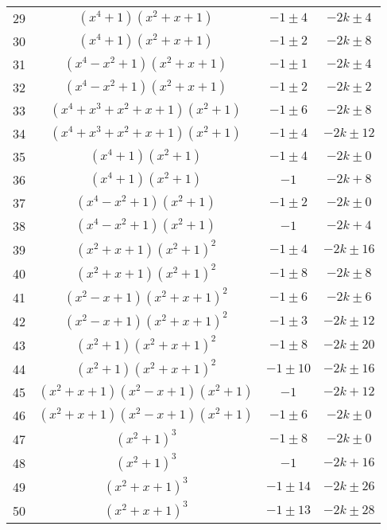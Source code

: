 \documentclass{amsart}
\begin{document}
\begin{table}[ht]
\begin{tabular}{|c |c |c |c |}
29 & $(x^4+1)(x^2+x+1)$ & $-1\pm4$ & $-2k\pm4$  \\
30 & $(x^4+1)(x^2+x+1)$ & $-1\pm2$ & $-2k\pm8$  \\
31 & $(x^4-x^2+1)(x^2+x+1)$ & $-1\pm1$ & $-2k\pm4$  \\
32 & $(x^4-x^2+1)(x^2+x+1)$ & $-1\pm2$ & $-2k\pm2$  \\
33 & $(x^4+x^3+x^2+x+1)(x^2+1)$ & $-1\pm6$ & $-2k\pm8$  \\
34 & $(x^4+x^3+x^2+x+1)(x^2+1)$ & $-1\pm4$ & $-2k\pm12$  \\
35 & $(x^4+1)(x^2+1)$ & $-1\pm4$ & $-2k\pm0$  \\
36 & $(x^4+1)(x^2+1)$ & $-1$ & $-2k+8$  \\
37 & $(x^4-x^2+1)(x^2+1)$ & $-1\pm2$ & $-2k\pm0$  \\
38 & $(x^4-x^2+1)(x^2+1)$ & $-1$ & $-2k+4$  \\
39 & $(x^2+x+1)(x^2+1)^2$ & $-1\pm4$ & $-2k\pm16$  \\
40 & $(x^2+x+1)(x^2+1)^2$ & $-1\pm8$ & $-2k\pm8$  \\
41 & $(x^2-x+1)(x^2+x+1)^2$ & $-1\pm6$ & $-2k\pm6$  \\
42 & $(x^2-x+1)(x^2+x+1)^2$ & $-1\pm3$ & $-2k\pm12$  \\
43 & $(x^2+1)(x^2+x+1)^2$ & $-1\pm8$ & $-2k\pm20$  \\
44 & $(x^2+1)(x^2+x+1)^2$ & $-1\pm10$ & $-2k\pm16$  \\
45 & $ (x^2+x+1)(x^2-x+1)(x^2+1)$ & $-1$ & $-2k+12$  \\
46 & $ (x^2+x+1)(x^2-x+1)(x^2+1)$ & $-1\pm6$ & $-2k\pm0$  \\
47 & $(x^2+1)^3$ & $-1\pm8$ & $-2k\pm0$  \\
48 & $(x^2+1)^3$ & $-1$ & $-2k+16$  \\
49 & $(x^2+x+1)^3$ & $-1\pm14$ & $-2k\pm26$ \\
50 & $(x^2+x+1)^3$ & $-1\pm13$ & $-2k\pm28$ \\
\hline
\end{tabular}
\end{table}
\end{document}
